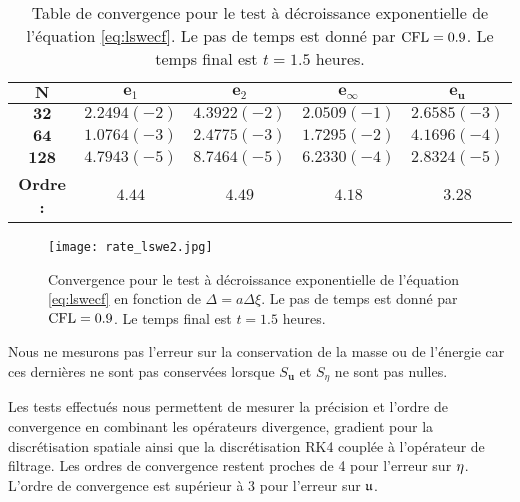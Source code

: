 \begin{table}[htbp]
\begin{center}
\begin{tabular}{|c||c|c|c|c|}
\hline 
$\mathbf{N}$ & $\mathbf{e}_1$ & $\mathbf{e}_2$ & $\mathbf{e}_{\infty}$ & $\mathbf{e}_{\mathbf{u}}$\\ 
\hline 
\hline 
$\mathbf{32}$ & $2.2494(-2)$ & $4.3922(-2)$ & $2.0509(-1)$ & $2.6585(-3)$\\ 

$\mathbf{64}$ & $1.0764(-3)$ & $2.4775(-3)$ & $1.7295(-2)$ & $4.1696(-4)$\\ 

$\mathbf{128}$ & $4.7943(-5)$ & $8.7464(-5)$ & $6.2330(-4)$ & $2.8324(-5)$\\

\hline
\textbf{Ordre :} & $4.44$ & $4.49$ & $4.18$ & $3.28$ \\ 
\hline
\end{tabular} 
\end{center}
\caption{Table de convergence pour le test à décroissance exponentielle de l'équation \eqref{eq:lswecf}. Le pas de temps est donné par $\text{CFL}=0.9$. Le temps final est $t=1.5$ heures.}
\label{tab:rate_lswe2}
\end{table}


\begin{figure}[htbp]
\begin{center}
\texttt{[image: rate\_lswe2.jpg]}
\end{center}
\caption{Convergence pour le test à décroissance exponentielle de l'équation \eqref{eq:lswecf} en fonction de $\Delta = a \Delta \xi$. Le pas de temps est donné par $\text{CFL}=0.9$. Le temps final est $t=1.5$ heures.}
\label{fig:rate_lswe2}
\end{figure}

Nous ne mesurons pas l'erreur sur la conservation de la masse ou de l'énergie car ces dernières ne sont pas conservées lorsque $S_{\mathbf{u}}$ et $S_{\eta}$ ne sont pas nulles.

Les tests effectués nous permettent de mesurer la précision et l'ordre de convergence en combinant les opérateurs divergence, gradient pour la discrétisation spatiale ainsi que la discrétisation RK4 couplée à l'opérateur de filtrage. Les ordres de convergence restent proches de 4 pour l'erreur sur $\mathbf{\eta}$. L'ordre de convergence est supérieur à 3 pour l'erreur sur $\mathfrak{u}$.



























